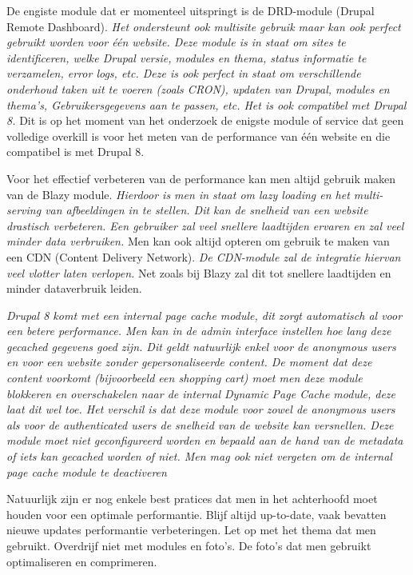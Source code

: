 De engiste module dat er momenteel uitspringt is de DRD-module (Drupal Remote Dashboard). \textit{Het ondersteunt ook multisite gebruik maar kan ook perfect gebruikt worden voor één website. Deze module is in staat om sites te identificeren, welke Drupal versie, modules en thema, status informatie te verzamelen, error logs, etc. Deze is ook perfect in staat om verschillende onderhoud taken uit te voeren (zoals CRON), updaten van Drupal, modules en thema's, Gebruikersgegevens aan te passen, etc. Het is ook compatibel met Drupal 8. }\autocite{DrupalCommunity2018} Dit is op het moment van het onderzoek de enigste module of service dat geen volledige overkill is voor het meten van de performance van één website en die compatibel is met Drupal 8.

Voor het effectief verbeteren van de performance kan men altijd gebruik maken van de Blazy module. \textit{Hierdoor is men in staat om lazy loading en het multi-serving van afbeeldingen in te stellen. Dit kan de snelheid van een website drastisch verbeteren. Een gebruiker zal veel snellere laadtijden ervaren en zal veel minder data verbruiken.}\autocite{DrupalCommunity2017} Men kan ook altijd opteren om gebruik te maken van een CDN (Content Delivery Network). \textit{De CDN-module zal de integratie hiervan veel vlotter laten verlopen.}\autocite{DrupalCommunity2019} Net zoals bij Blazy zal dit tot snellere laadtijden en minder dataverbruik leiden.

\textit{Drupal 8 komt met een internal page cache module, dit zorgt automatisch al voor een betere performance. Men kan in de admin interface instellen hoe lang deze gecached gegevens goed zijn. Dit geldt natuurlijk enkel voor de anonymous users en voor een website zonder gepersonaliseerde content. De moment dat deze content voorkomt (bijvoorbeeld een shopping cart) moet men deze module blokkeren en overschakelen naar de internal Dynamic Page Cache module, deze laat dit wel toe. Het verschil is dat deze module voor zowel de anonymous users als voor de authenticated users de snelheid van de website kan versnellen. Deze module moet niet geconfigureerd worden en bepaald aan de hand van de metadata of iets kan gecached worden of niet. Men mag ook niet vergeten om de internal page cache module te deactiveren} \autocite{DrupalCommunity2019a,DrupalCommunity2018a}

Natuurlijk zijn er nog enkele best pratices dat men in het achterhoofd moet houden voor een optimale performantie. Blijf altijd up-to-date, vaak bevatten nieuwe updates performantie verbeteringen. Let op met het thema dat men gebruikt. Overdrijf niet met modules en foto's. De foto's dat men gebruikt optimaliseren en comprimeren.

